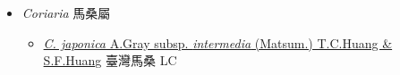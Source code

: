 
  \begin{itemize}
 \item[] \textit{Coriaria} 馬桑屬
                    
  \begin{itemize}
        \item[] \href{http://www.theplantlist.org/tpl1.1/search?q=Coriaria+japonica+subsp.+intermedia}{\textit{C. japonica} A.Gray subsp. \textit{intermedia} (Matsum.) T.C.Huang \& S.F.Huang}   臺灣馬桑 LC
  \end{itemize}
  \end{itemize}
